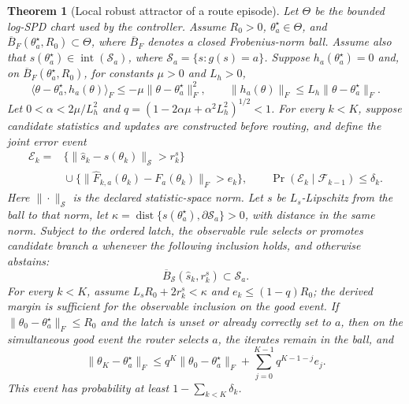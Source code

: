 \documentclass[11pt]{article}
\theoremstyle{plain}
\newtheorem{theorem}{Theorem}
\theoremstyle{definition}
\theoremstyle{remark}
\begin{document}
\begin{theorem}[Local robust attractor of a route episode]\label{thm:attractor}
Let $\Theta$ be the bounded log-SPD chart used by the controller. Assume
$R_0>0$, $\theta_a^\star\in\Theta$, and
$\overline B_F(\theta_a^\star,R_0)\subset\Theta$, where
$\overline B_F$ denotes a closed Frobenius-norm ball. Assume also that
$s(\theta_a^\star)\in\operatorname{int}(\mathcal S_a)$, where
$\mathcal S_a=\{s:g(s)=a\}$. Suppose $h_a(\theta_a^\star)=0$ and, on
$\overline B_F(\theta_a^\star,R_0)$, for constants $\mu>0$ and $L_h>0$,
\[
 \langle\theta-\theta_a^\star,h_a(\theta)\rangle_F
 \le-\mu\|\theta-\theta_a^\star\|_F^2,\qquad
 \|h_a(\theta)\|_F\le L_h\|\theta-\theta_a^\star\|_F.
\]
Let $0<\alpha<2\mu/L_h^2$ and
$q=(1-2\alpha\mu+\alpha^2L_h^2)^{1/2}<1$. For every $k<K$, suppose
candidate statistics and updates are constructed before routing, and define
the joint error event
\[
\begin{aligned}
\mathcal E_k={}&
 \{\|\widehat s_k-s(\theta_k)\|_{\mathcal S}>r_k^s\}\\
 &{}\cup
 \{\|\widehat F_{k,a}(\theta_k)-F_a(\theta_k)\|_F>e_k\},
 \qquad
 \Pr(\mathcal E_k\mid\mathcal F_{k-1})\le\delta_k .
\end{aligned}
\]
Here $\|\cdot\|_{\mathcal S}$ is the declared statistic-space norm. Let $s$ be
$L_s$-Lipschitz from the ball to that norm, let
$\kappa=\operatorname{dist}\{s(\theta_a^\star),
\partial\mathcal S_a\}>0$, with distance in the same norm. Subject to the
ordered latch, the observable rule selects or promotes candidate branch $a$
whenever the following inclusion holds, and otherwise abstains:
\[
\overline B_{\mathcal S}(\widehat s_k,r_k^s)\subset\mathcal S_a.
\]
For every $k<K$, assume $L_sR_0+2r_k^s<\kappa$ and
$e_k\le(1-q)R_0$; the derived margin is sufficient for the observable
inclusion on the good event.
If $\|\theta_0-\theta_a^\star\|_F\le R_0$ and the latch is unset or already
correctly set to $a$, then on the simultaneous good event the router selects
$a$, the iterates remain in the ball, and
\begin{equation}
 \|\theta_K-\theta_a^\star\|_F
 \le q^K\|\theta_0-\theta_a^\star\|_F
     +\sum_{j=0}^{K-1}q^{K-1-j}e_j.                          \label{eq:contract}
\end{equation}
This event has probability at least $1-\sum_{k<K}\delta_k$.
\end{theorem}
\end{document}
